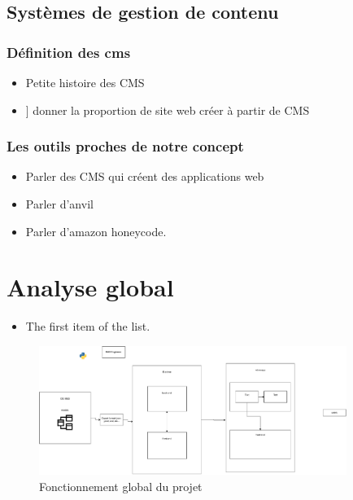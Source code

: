 \documentclass{rapport_stage}
\begin{document}
\section{Systèmes de gestion de contenu}



\subsection*{Définition des \gls{cms}}

\begin{itemize}[label=$\bullet$]
  \item Petite histoire des CMS
        \item] donner la proportion de site web créer à partir de CMS
\end{itemize}

\subsection*{Les outils proches de notre concept}

\begin{itemize}[label=$\bullet$]
  \item Parler des CMS qui créent des applications web
  \item Parler d'anvil
  \item Parler d'amazon honeycode.
\end{itemize}

\chapter{Analyse global}

\begin{itemize}[label=$\bullet$]
  \item The first item of the list.
\end{itemize}

\begin{figure}[ht]
  \centering
  \includegraphics[width=10cm]{figures/architecture_global.pdf}
  \caption{Fonctionnement global du projet}
  \label{fig:fonctionnement-lobal-projet}
\end{figure}
\end{document}
